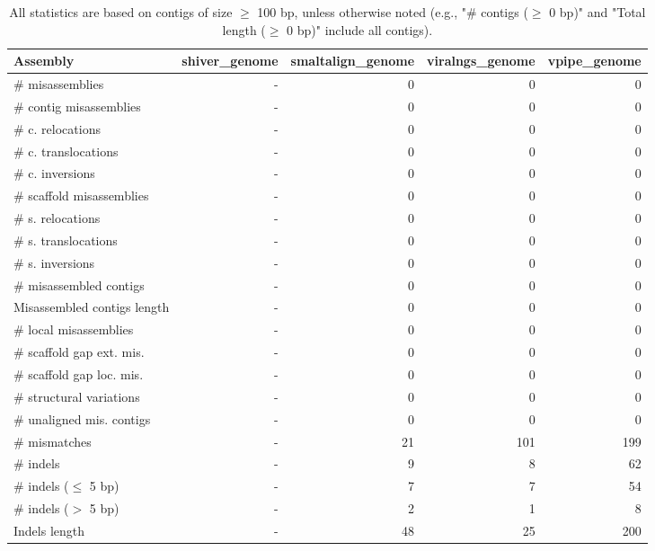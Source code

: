 \documentclass[12pt,a4paper]{article}
\begin{document}
\begin{table}[ht]
\begin{center}
\caption{All statistics are based on contigs of size $\geq$ 100 bp, unless otherwise noted (e.g., "\# contigs ($\geq$ 0 bp)" and "Total length ($\geq$ 0 bp)" include all contigs).}
\begin{tabular}{|l*{4}{|r}|}
\hline
Assembly & shiver\_genome & smaltalign\_genome & viralngs\_genome & vpipe\_genome \\ \hline
\# misassemblies & - & 0 & 0 & 0 \\ \hline
\hspace{2mm}\# contig misassemblies & - & 0 & 0 & 0 \\ \hline
\hspace{5mm}\# c. relocations & - & 0 & 0 & 0 \\ \hline
\hspace{5mm}\# c. translocations & - & 0 & 0 & 0 \\ \hline
\hspace{5mm}\# c. inversions & - & 0 & 0 & 0 \\ \hline
\hspace{2mm}\# scaffold misassemblies & - & 0 & 0 & 0 \\ \hline
\hspace{5mm}\# s. relocations & - & 0 & 0 & 0 \\ \hline
\hspace{5mm}\# s. translocations & - & 0 & 0 & 0 \\ \hline
\hspace{5mm}\# s. inversions & - & 0 & 0 & 0 \\ \hline
\# misassembled contigs & - & 0 & 0 & 0 \\ \hline
Misassembled contigs length & - & 0 & 0 & 0 \\ \hline
\# local misassemblies & - & 0 & 0 & 0 \\ \hline
\# scaffold gap ext. mis. & - & 0 & 0 & 0 \\ \hline
\# scaffold gap loc. mis. & - & 0 & 0 & 0 \\ \hline
\# structural variations & - & 0 & 0 & 0 \\ \hline
\# unaligned mis. contigs & - & 0 & 0 & 0 \\ \hline
\# mismatches & - & 21 & 101 & 199 \\ \hline
\# indels & - & 9 & 8 & 62 \\ \hline
\hspace{5mm}\# indels ($\leq$ 5 bp) & - & 7 & 7 & 54 \\ \hline
\hspace{5mm}\# indels ($>$ 5 bp) & - & 2 & 1 & 8 \\ \hline
Indels length & - & 48 & 25 & 200 \\ \hline
\end{tabular}
\end{center}
\end{table}
\end{document}
